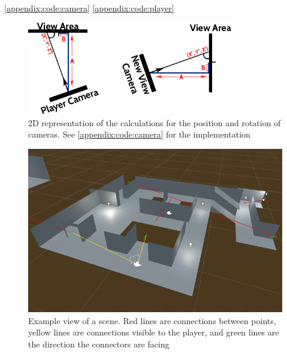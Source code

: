 		\autoref{appendix:code:camera} \autoref{appendix:code:player}

	\begin{figure}[H]
		\includegraphics[width=0.8\textwidth]{Images/Position}
		\centering
		\caption{2D representation of the calculations for the position and rotation of cameras.
			See \autoref{appendix:code:camera} for the implementation}
		\label{design:fig:maths}
	\end{figure}

	\begin{figure}[H]
		\includegraphics[width=1\textwidth]{Images/Lines_Everywhere2}
		\centering
		\caption{Example view of a scene.
			Red lines are connections between points,
			yellow lines are connections visible to the player,
			and green lines are the direction the connectors are facing}
		\label{design:fig:scene}
	\end{figure}

